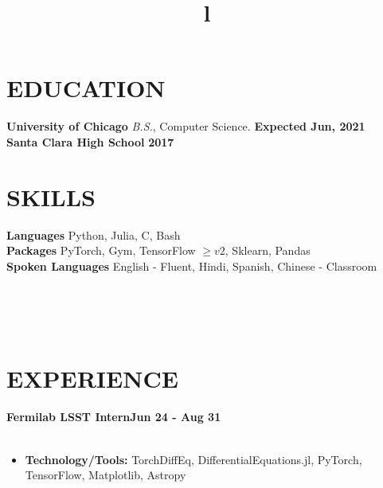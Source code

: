 \documentclass[margin]{res}
\begin{document}
\begin{resume}

\section{EDUCATION}
\textbf{University of Chicago}
{\sl B.S.}, Computer Science. \hfill \textbf{Expected Jun, 2021}\\
\textbf{Santa Clara High School} \hfill \textbf{2017}
\section{SKILLS}
\textbf{Languages} Python, Julia, C, Bash\\
\textbf{Packages}  PyTorch, Gym, TensorFlow $\geq v2$, Sklearn, Pandas \\
\textbf{Spoken Languages} English - Fluent, Hindi, Spanish, Chinese - Classroom

\begin{format}
\title{l}\\
\\
\body\\
\end{format}
\section{EXPERIENCE}
\textbf{Fermilab LSST Intern\hfill Jun 24 - Aug 31}\\
\\
\begin{itemize}
    \item \textbf{Technology/Tools:} TorchDiffEq, DifferentialEquations.jl, PyTorch, TensorFlow, Matplotlib, Astropy
\end{itemize}

\end{resume}
\end{document}
